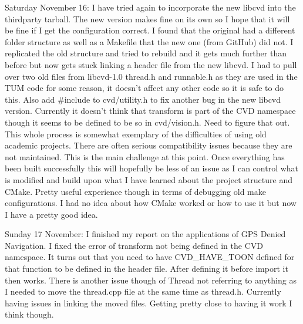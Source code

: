 \documentclass[]{../resources/final_report}
\begin{document}
\begin{appendices}
  Saturday November 16: I have tried again to incorporate the new libcvd into the thirdparty tarball. The new version makes fine on its own so I hope that it will be fine if I get the configuration correct. I found that the original had a different folder structure as well as a Makefile that the new one (from GitHub) did not. I replicated the old structure and tried to rebuild and it gets much further than before but now gets stuck linking a header file from the new libcvd. I had to pull over two old files from libcvd-1.0 thread.h and runnable.h as they are used in the TUM code for some reason, it doesn’t affect any other code so it is safe to do this. Also add \#include to cvd/utility.h to fix another bug in the new libcvd version. Currently it doesn’t think that transform is part of the CVD namespace though it seems to be defined to be so in cvd/vision.h. Need to figure that out. This whole process is somewhat exemplary of the difficulties of using old academic projects. There are often serious compatibility issues because they are not maintained. This is the main challenge at this point. Once everything has been built successfully this will hopefully be less of an issue as I can control what is modified and build upon what I have learned about the project structure and CMake. Pretty useful experience though in terms of debugging old make configurations. I had no idea about how CMake worked or how to use it but now I have a pretty good idea.
  
  Sunday 17 November: I finished my report on the applications of GPS Denied Navigation. I fixed the error of transform not being defined in the CVD namespace. It turns out that you need to have CVD\_HAVE\_TOON defined for that function to be defined in the header file. After defining it before import it then works. There is another issue though of Thread not referring to anything as I needed to move the thread.cpp file at the same time as thread.h. Currently having issues in linking the moved files. Getting pretty close to having it work I think though.
  

\end{appendices}
\end{document}

